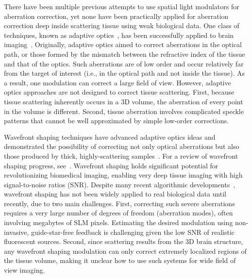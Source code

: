  
 There have been multiple previous attempts to use spatial light modulators for aberration correction, yet none have been practically applied for aberration correction deep inside scattering tissue using weak biological data. One class of techniques, known as adaptive optics~\cite{Booth2014,Ji2017review,HampsonBooth21review,wang2015direct}, has been successfully applied to brain imaging~\cite{ji2009adaptive,ji2012characterization,Wang2014Multiplexed,Papadopoulos16,Rodriguez2021Adaptive}. Originally, adaptive optics aimed to correct aberrations in the optical path, or those formed by the mismatch between the refractive index of the tissue and that of the optics. Such aberrations are of low order and occur relatively far from the target of interest (i.e., in the optical path and not inside the tissue). As a result, one modulation can correct a large field of view. However, adaptive optics approaches are not designed to correct tissue scattering. First, because tissue scattering inherently occurs in a 3D volume, the aberration of every point in the volume is different. Second, tissue aberration involves complicated speckle patterns that cannot be well approximated by simple low-order corrections.
 
   
 Wavefront shaping techniques have advanced adaptive optics ideas and demonstrated the possibility of correcting not only optical aberrations but also those produced by thick, highly-scattering samples~\cite{Vellekoop:07,Yaqoob2008,Vellekoop2010,Vellekoop2012}. For a review of wavefront shaping progress, see~\cite{Horstmeyer15,YU2015632,Gigan22}. Wavefront shaping holds significant potential for revolutionizing biomedical imaging, enabling very deep tissue imaging with high signal-to-noise ratios (SNR). Despite many recent algorithmic developments~\cite{Horstmeyer15,Tang2012,Katz:14,Wang20142PAdaptive,Liu2018,Fiolka:12,Jang:13,Xu11,Wang2012,Kong:11,Vellekoop2012,YeminyKatz2021,Stern:19,Daniel:19,Boniface:19,Dror22}, wavefront shaping has not been widely applied to real biological data until recently, due to two main challenges. First, correcting such severe aberrations requires a very large number of degrees of freedom (aberration modes), often involving  megabytes of SLM pixels. Estimating the desired modulation using non-invasive, guide-star-free feedback is challenging given the low SNR of realistic fluorescent sources. Second, since scattering results from the 3D brain structure, any wavefront shaping modulation can only correct extremely localized regions of the tissue volume, making it unclear how to use such systems for wide field of view imaging.
 
